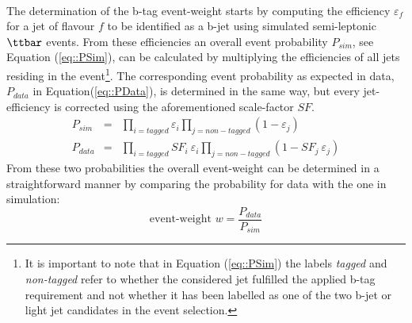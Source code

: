 \\
The determination of the b-tag event-weight starts by computing the efficiency $\varepsilon_{f}$ for a jet of flavour $f$ to be identified as a b-jet using simulated semi-leptonic $\ttbar$ events.
From these efficiencies an overall event probability $P_{sim}$, see Equation (\ref{eq::PSim}), can be calculated by multiplying the efficiencies of all jets residing in the event\footnote{It is important to note that in Equation (\ref{eq::PSim}) the labels \textit{tagged} and \textit{non-tagged} refer to whether the considered jet fulfilled the applied b-tag requirement and not whether it has been labelled as one of the two b-jet or light jet candidates in the event selection.}.
The corresponding event probability as expected in data, $P_{data}$ in Equation(\ref{eq::PData}), is determined in the same way, but every jet-efficiency is corrected using the aforementioned scale-factor $SF$.
\begin{eqnarray} 
 P_{sim} & = & \prod_{i = tagged} \varepsilon_{i} \prod_{j = non-tagged} (1-\varepsilon_{j})  \label{eq::PSim} \\
 P_{data} & = & \prod_{i = tagged} SF_{i} ~ \varepsilon_{i} \prod_{j = non-tagged} (1- SF_{j} ~ \varepsilon_{j}) \label{eq::PData}
\end{eqnarray}
From these two probabilities the overall event-weight can be determined in a straightforward manner by comparing the probability for data with the one in simulation:
\begin{equation}
 \textrm{event-weight } w = \dfrac{P_{data}}{P_{sim}}
\end{equation}

